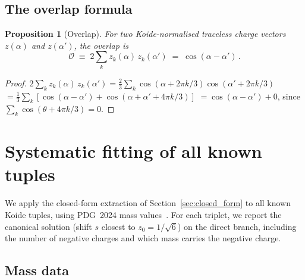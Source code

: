 \documentclass[preprint,12pt]{elsarticle}
\newtheorem{proposition}[theorem]{Proposition}
\begin{document}
\subsection{The overlap formula}

\begin{proposition}[Overlap]
\label{prop:overlap}
For two Koide-normalised traceless charge vectors
$z(\alpha)$ and $z(\alpha')$, the overlap is
\begin{equation}
  \mathcal{O} \;\equiv\; 2\sum_k z_k(\alpha)\,z_k(\alpha')
  \;=\; \cos(\alpha - \alpha')\,.
  \label{eq:overlap}
\end{equation}
\end{proposition}

\begin{proof}
$2\sum_k z_k(\alpha)\,z_k(\alpha')
= \frac{2}{3}\sum_k \cos(\alpha + 2\pi k/3)\cos(\alpha' + 2\pi k/3)$
$= \frac{1}{3}\sum_k [\cos(\alpha - \alpha') + \cos(\alpha + \alpha' + 4\pi k/3)]$
$= \cos(\alpha - \alpha') + 0$,
since $\sum_k \cos(\theta + 4\pi k/3) = 0$.
\end{proof}


\section{Systematic fitting of all known tuples}
\label{sec:fitting}

We apply the closed-form extraction of
Section~\ref{sec:closed_form} to all known Koide tuples,
using PDG~2024 mass values~\cite{PDG:2024}.
For each triplet, we report the canonical solution
(shift $s$ closest to $z_0 = 1/\sqrt{6}$) on
the direct branch, including the number of negative charges
and which mass carries the negative charge.

\subsection{Mass data}
\end{document}
